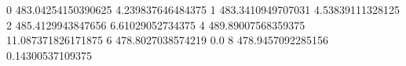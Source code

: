 0 483.04254150390625 4.239837646484375
1 483.3410949707031 4.53839111328125
2 485.4129943847656 6.61029052734375
4 489.89007568359375 11.087371826171875
6 478.8027038574219 0.0
8 478.9457092285156 0.14300537109375
